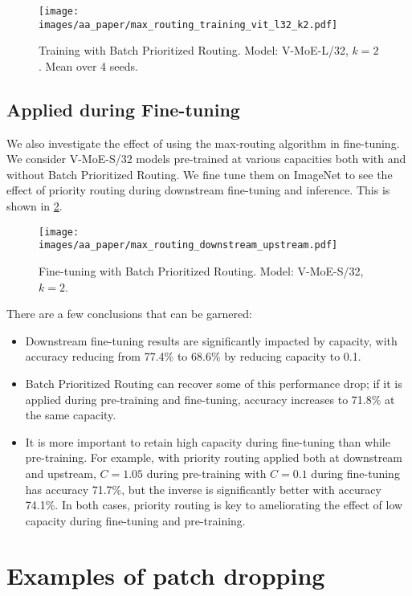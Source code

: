 \documentclass{article}
\newcommand{\abbv}{{V-MoE}}
\newcommand{\maxrouting}{Batch Prioritized Routing}
\begin{document}
\begin{figure}[h]
\centering
\texttt{[image: images/aa\_paper/max\_routing\_training\_vit\_l32\_k2.pdf]}
\caption{Training with \maxrouting{}. Model: \abbv{}-L/32, $k = 2$. Mean over 4 seeds.}
\label{im:training_max_routing_vit_l_k2}
\end{figure}

\clearpage

\subsection{Applied during Fine-tuning}
We also investigate the effect of using the max-routing algorithm in fine-tuning. We consider \abbv{}-S/32 models pre-trained at various capacities both with and without \maxrouting{}. We fine tune them on ImageNet to see the effect of priority routing during downstream fine-tuning and inference. This is shown in \cref{im:finetuning_max_routing}.

\begin{figure}[h]
\centering
\texttt{[image: images/aa\_paper/max\_routing\_downstream\_upstream.pdf]}
\caption{Fine-tuning with \maxrouting{}. Model: \abbv{}-S/32, $k = 2$.}
\label{im:finetuning_max_routing}
\end{figure}

There are a few conclusions that can be garnered:
\begin{itemize}
    \item Downstream fine-tuning results are significantly impacted by capacity, with accuracy reducing from 77.4\% to 68.6\% by reducing capacity to 0.1.
    \item \maxrouting{} can recover some of this performance drop; if it is applied during pre-training and fine-tuning, accuracy increases to 71.8\% at the same capacity.
    \item It is more important to retain high capacity during fine-tuning than while pre-training. For example, with priority routing applied both at downstream and upstream, $C=1.05$ during pre-training with $C=0.1$ during fine-tuning has accuracy 71.7\%, but the inverse is significantly better with accuracy 74.1\%. In both cases, priority routing is key to ameliorating the effect of low capacity during fine-tuning and pre-training.
\end{itemize}
 \clearpage
\section{Examples of patch dropping}
\label{app_skip_patch_images}
\end{document}
